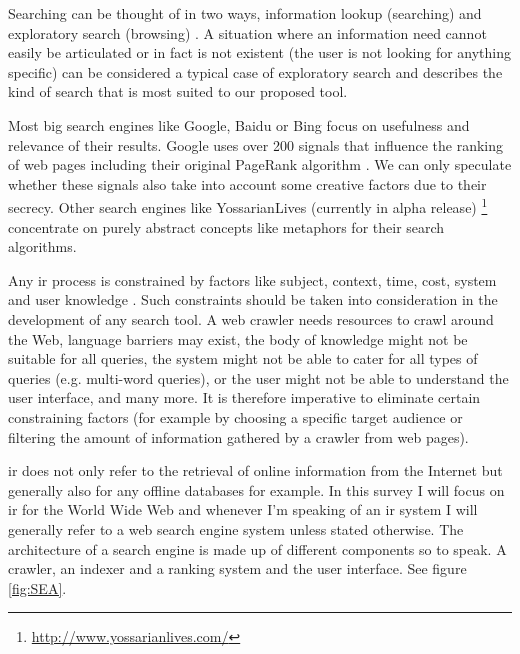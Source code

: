 Searching can be thought of in two ways, information lookup (searching) and exploratory search (browsing) \citep{DeVries1993,Marchionini2006}. A situation where an information need cannot easily be articulated or in fact is not existent (the user is not looking for anything specific) can be considered a typical case of exploratory search and describes the kind of search that is most suited to our proposed tool.

Most big search engines like Google, Baidu or Bing focus on usefulness and relevance of their results.\citep{Google2012, Baidu2012, Microsoft2012a} Google uses over 200 signals \citep{Google2012} that influence the ranking of web pages including their original PageRank algorithm \citep{Brin1998, Brin1998b}. We can only speculate whether these signals also take into account some creative factors due to their secrecy. Other search engines like YossarianLives (currently in alpha release) \footnote{\url{http://www.yossarianlives.com/}} concentrate on purely abstract concepts like metaphors for their search algorithms.

Any \gls{ir} process is constrained by factors like subject, context, time, cost, system and user knowledge \citep{Marchionini1988}. Such constraints should be taken into consideration in the development of any search tool. A web crawler needs resources to crawl around the Web, language barriers may exist, the body of knowledge might not be suitable for all queries, the system might not be able to cater for all types of queries (e.g. multi-word queries), or the user might not be able to understand the user interface, and many more. It is therefore imperative to eliminate certain constraining factors (for example by choosing a specific target audience or filtering the amount of information gathered by a crawler from web pages).

\gls{ir} does not only refer to the retrieval of online information from the Internet but generally also for any offline databases for example. In this survey I will focus on \gls{ir} for the World Wide Web and whenever I'm speaking of an \gls{ir} system I will generally refer to a web search engine system unless stated otherwise. The architecture of a search engine is made up of different components so to speak. A crawler, an indexer and a ranking system and the user interface. See figure \ref{fig:SEA}.

